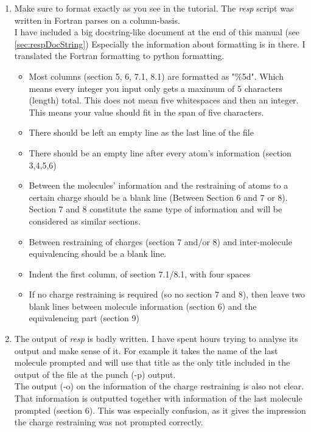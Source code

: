 \documentclass[a4paper]{article}
\begin{document}
\begin{enumerate}
    \item Make sure to format exactly as you see in the tutorial. The \textit{resp} script was written in Fortran parses on a column-basis.\\
        I have included a big docstring-like document at the end of this manual (see \ref{sec:respDocString})
        Especially the information about formatting is in there. I translated the Fortran formatting to python formatting.
        \begin{itemize}
            \item Most columns (section 5, 6, 7.1, 8.1) are formatted as "\%5d". Which means every integer you input only gets a maximum of 5 characters (length) total. This does not mean five whitespaces and then an integer. This means your value should fit in the span of five characters.
            \item There should be left an empty line as the last line of the file
            \item There should be an empty line after every atom's information (section 3,4,5,6)
            \item Between the molecules' information and the restraining of atoms to a certain charge should be a blank line (Between Section 6 and 7 or 8). Section 7 and 8 constitute the same type of information and will be considered as similar sections.
            \item Between restraining of charges (section 7 and/or 8) and inter-molecule equivalencing should be a blank line.
            \item Indent the first column, of section 7.1/8.1, with four spaces
            \item If no charge restraining is required (so no section 7 and 8), then leave two blank lines between molecule information (section 6) and the equivalencing part (section 9)
        \end{itemize}
    \item The output of \textit{resp} is badly written. I have spent hours trying to analyse its output and make sense of it. For example it takes the name of the last molecule prompted and will use that title as the only title included in the output of the file at the punch (-p) output.\\
        The output (-o) on the information of the charge restraining is also not clear. That information is outputted together with information of the last molecule prompted (section 6). This was especially confusion, as it gives the impression the charge restraining was not prompted correctly.

\end{enumerate}
\end{document}

